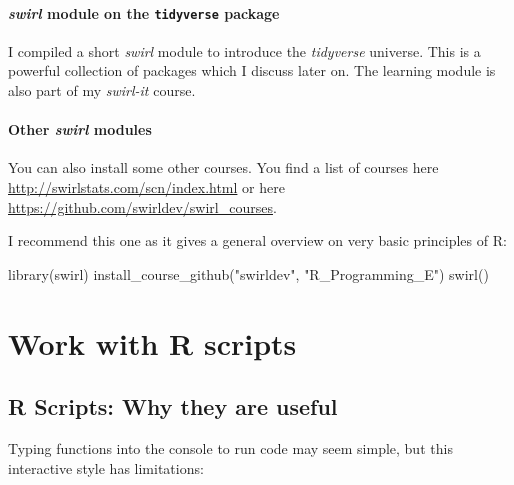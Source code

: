 \documentclass[
  12pt,
  oneside]{book}
\newenvironment{Shaded}{\begin{snugshade}}{\end{snugshade}}
\newcommand{\FunctionTok}[1]{\textcolor[rgb]{0.00,0.00,0.00}{#1}}
\newcommand{\NormalTok}[1]{#1}
\newcommand{\StringTok}[1]{\textcolor[rgb]{0.31,0.60,0.02}{#1}}
\theoremstyle{definition}
\theoremstyle{definition}
\theoremstyle{definition}
\theoremstyle{definition}
\theoremstyle{remark}
\begin{document}
\hypertarget{swirl-module-on-the-tidyverse-package}{%
\subsubsection*{\texorpdfstring{\emph{swirl} module on the \texttt{tidyverse} package}{swirl module on the tidyverse package}}\label{swirl-module-on-the-tidyverse-package}}

I compiled a short \emph{swirl} module to introduce the \emph{tidyverse} universe. This is a powerful collection of packages which I discuss later on. The learning module is also part of my \emph{swirl-it} course.

\hypertarget{other-swirl-modules}{%
\subsubsection*{\texorpdfstring{Other \emph{swirl} modules}{Other swirl modules}}\label{other-swirl-modules}}

You can also install some other courses. You find a list of courses here \url{http://swirlstats.com/scn/index.html} or here \url{https://github.com/swirldev/swirl_courses}.

I recommend this one as it gives a general overview on very basic principles of R:

\begin{Shaded}
\begin{Highlighting}[]
\FunctionTok{library}\NormalTok{(swirl)}
\FunctionTok{install\_course\_github}\NormalTok{(}\StringTok{"swirldev"}\NormalTok{, }\StringTok{"R\_Programming\_E"}\NormalTok{)}
\FunctionTok{swirl}\NormalTok{()}
\end{Highlighting}
\end{Shaded}

\hypertarget{work-with-r-scripts}{%
\chapter{Work with R scripts}\label{work-with-r-scripts}}

\hypertarget{r-scripts-why-they-are-useful}{%
\section{R Scripts: Why they are useful}\label{r-scripts-why-they-are-useful}}

Typing functions into the console to run code may seem simple, but this interactive style has limitations:
\end{document}
